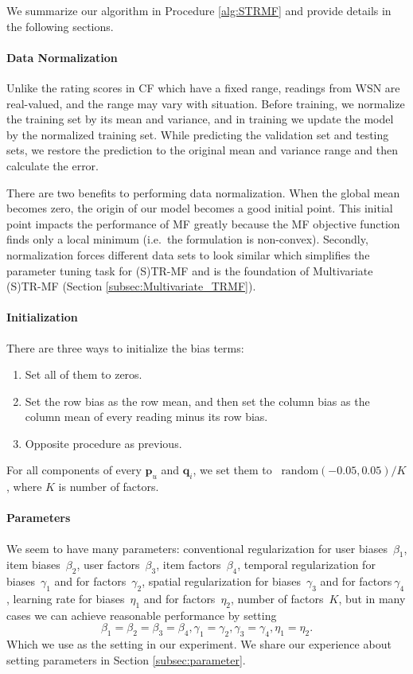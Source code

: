 We summarize our algorithm in Procedure \ref{alg:STRMF} and provide details in the following sections.

\paragraph*{Data Normalization}

Unlike the rating scores in CF which have a fixed range, readings from WSN are real-valued, and the range may vary with situation.
Before training, we normalize the training set by its mean and variance, and in training we update the model by the normalized training set.
While predicting the validation set and testing sets, we restore the prediction to the original mean and variance range and then calculate the error.

There are two benefits to performing data normalization.
When the global mean becomes zero, the origin of our model becomes a good initial point.
This initial point impacts the performance of MF greatly because the MF objective function finds only a local minimum (i.e.\ the formulation is non-convex).
Secondly, normalization forces different data sets to look similar which simplifies the parameter tuning task for (S)TR-MF and is the foundation of Multivariate (S)TR-MF (Section \ref{subsec:Multivariate_TRMF}). 


\paragraph*{Initialization}

There are three ways to initialize the bias terms:
\begin{enumerate}
	\setlength {\itemsep}{-5pt}
	\item Set all of them to zeros.
	\item Set the row bias as the row mean, and then set the column bias as the column mean of every reading minus its row bias.
	\item Opposite procedure as previous.
\end{enumerate}
For all components of every $\mathbf{p}_{u}$ and $\mathbf{q}_{i}$, we set them to ~$\mbox{random}(-0.05,0.05)/K$, where $K$ is number of factors.

\paragraph*{Parameters}

We seem to have many parameters: conventional regularization for user biases~$\beta_1$, item biases~$\beta_2$, user factors~$\beta_3$, item factors~$\beta_4$, temporal regularization for biases~$\gamma_1$ and for factors~$\gamma_2$, spatial regularization for biases~$\gamma_3$ and for factors$~\gamma_4$, learning rate for biases~$\eta_1$ and for factors~$\eta_2$, number of factors~$K$, but in many cases we can achieve reasonable performance by setting 
\begin{equation*}\beta_1 = \beta_2 = \beta_3 = \beta_4, \gamma_1 = \gamma_2, \gamma_3 = \gamma_4, \eta_1 = \eta_2. \end{equation*}
Which we use as the setting in our experiment.
We share our experience about setting parameters in Section \ref{subsec:parameter}.

